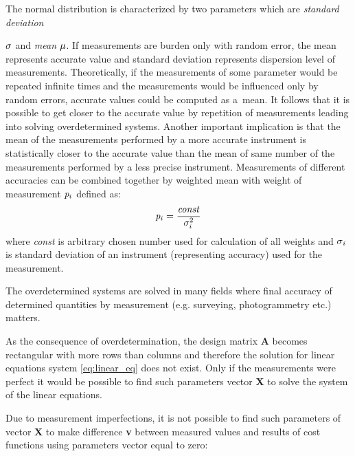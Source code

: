 \documentclass[a4paper,12pt]{article}
\newcommand{\ematr}[1]{%
{\bf #1}%
}
\newcommand{\evect}[1]{%
{\bf #1}%
}
\newcommand{\escal}[1]{%
{\it #1}%
}
\newcommand{\term}[1]{%
{\it #1}%
}
\begin{document}
\begin{itemize}

The normal distribution is characterized by two parameters which are \term{standard deviation}
$\escal{\sigma}$ and \term{mean} $\escal{\mu}$. 
If measurements are burden only with random error, the mean represents accurate value and standard deviation represents 
dispersion level of measurements. 
Theoretically,  if the measurements of some parameter would be repeated infinite times and the measurements would be influenced only by random errors,
accurate values could be computed as a~mean.
It follows that it is possible to get closer to the accurate value by repetition of measurements
leading into solving overdetermined systems. Another important implication 
is that the mean of the measurements performed by a more accurate 
instrument is statistically closer to the accurate value than the mean of same number of the measurements performed
by a less precise instrument.
Measurements of different accuracies can be combined together by weighted mean
with weight of measurement $\escal{p}_{i}$ defined as:
\begin{equation}
\label{eq:wmean}
\escal{p}_{i} = \frac{\escal{const}}{\escal{\sigma}_{i}^{2}}
\end{equation} 
where \escal{const} is arbitrary chosen number used for calculation of all weights 
and $\escal{\sigma_{i}}$ is standard deviation of an instrument (representing accuracy) used for the measurement.
\end{itemize}

The overdetermined systems are solved in many fields where final accuracy of determined 
quantities by measurement (e.g. 
surveying, photogrammetry etc.) matters.


As the consequence of overdetermination, the design matrix \ematr{A} becomes rectangular with more rows than columns 
and therefore the solution for linear equations system \eqref{eq:linear_eq} does not exist.
Only if the measurements were perfect it would be possible to find such parameters vector \evect{X} to 
solve the system of the linear equations. 


Due to measurement imperfections, it is not possible to find such parameters of vector \evect{X} to make difference
\evect{v} between measured values and results of cost functions using  parameters vector equal to zero:
\end{document}

